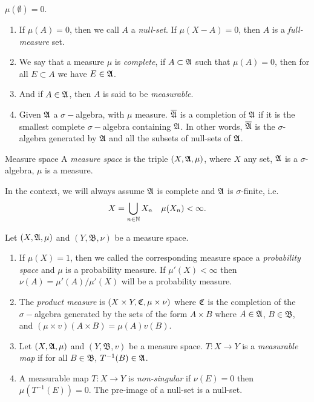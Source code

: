 \documentclass[12pt,a4paper]{article}
\begin{document}
	\begin{proposition}{}{}
		$\mu(\emptyset)=0$.
	\end{proposition}

	\newcommand{\B}{\mathfrak{B}}
	
	\begin{definition}{}{}
		\begin{enumerate}
		\item If $\mu (A)=0$, then we call $A$ a \emph{null-set}. If $\mu(X-A)=0$, then $A$ is a \emph{full-measure} set.
		
		\item We say that a measure $\mu$ is \emph{complete}, if $A\subset \mathfrak{A}$ such that $\mu(A)=0$, then for all $E\subset A$ we have $E\in \mathfrak{A}$.
		
		\item And if $A\in \mathfrak{A}$, then $A$ is said to be \emph{measurable}.
		
		\item Given $\mathfrak{A}$ a $\sigma-$algebra, with $\mu$ measure. $\overline{\mathfrak{A}}$ is a completion of $\mathfrak{A}$ if it is the smallest complete $\sigma-$algebra containing $\mathfrak{A}$. In other words, $\overline{\mathfrak{A}}$ is the $\sigma$-algebra generated by $\mathfrak{A}$ and all the subsets of null-sets of $\mathfrak{A}$.
		\end{enumerate}
	\end{definition}
	\begin{definition}{Measure space}{}
		A \emph{measure space} is the triple $(X,\mathfrak{A},\mu)$, where $X$ any set, $\mathfrak{A}$ is a $\sigma$-algebra, $\mu$ is a measure. 
	\end{definition}
		In the context, we will always assume $\mathfrak{A} $ is complete and $\mathfrak{A}$ is $\sigma$-finite, i.e.
		$$
		X=\bigcup_{n\in \mathbb{N}} X_n \quad \mu(X_n)<\infty.
		$$
	\begin{definition}{}{}
		Let $(X,\mathfrak{A},\mu)$ and $(Y,\B,\nu)$ be a measure space.
		\begin{enumerate}
			\item If $\mu(X)=1$, then we called the corresponding measure space a \emph{probability space} and $\mu$ is a probability measure. If $\mu'(X)<\infty$ then $\nu(A)=\mu'(A)/\mu'(X)$ will be a probability measure.
			\item The \emph{product measure} is 
			$
			(X\times Y, \mathfrak{C}, \mu\times \nu)
			$
			where $\mathfrak{C}$ is the completion of the $\sigma-$algebra generated by the sets of the form $A\times B$ where $A\in \mathfrak{A}$, $B\in \B$, and $(\mu\times v)(A\times B)=\mu(A)v(B)$.
			\item Let $(X,\mathfrak{A},\mu)$ and $(Y,\B,v)$ be a measure space. $T:X\rightarrow Y$ is a \emph{measurable map} if for all $B\in\B$, $T^{-1}(B)\in \mathfrak{A}$.
			\item A measurable map $T:X\rightarrow Y$ is \emph{non-singular} if $\nu(E)=0$ then $\mu(T^{-1}(E))=0$. The pre-image of a null-set is a null-set.
		\end{enumerate}
	\end{definition}
\end{document}
